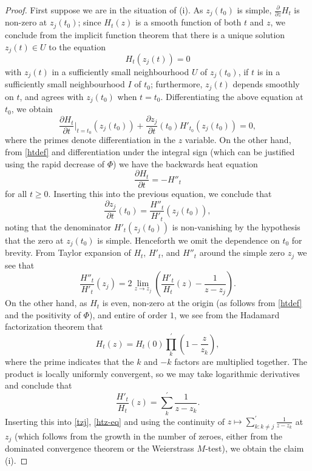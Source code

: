 \documentclass[a4paper,11pt,twoside]{amsart}
\begin{document}
\begin{proof}  First suppose we are in the situation of (i).  As $z_j(t_0)$ is simple, $\frac{\partial}{\partial z} H_t$ is non-zero at $z_j(t_0)$; since $H_t(z)$ is a smooth function of both $t$ and $z$, we conclude from the implicit function theorem that there is a unique solution $z_j(t) \in U$ to the equation
$$ H_t( z_j(t) ) = 0$$
with $z_j(t)$ in a sufficiently small neighbourhood $U$ of $z_j(t_0)$, if $t$ is in a sufficiently small neighbourhood $I$ of $t_0$; furthermore, $z_j(t)$ depends smoothly on $t$, and agrees with $z_j(t_0)$ when $t=t_0$.  Differentiating the above equation at $t_0$, we obtain
$$ \frac{\partial H_t}{\partial t}|_{t=t_0}( z_j(t_0) ) + \frac{\partial z_j}{\partial t}(t_0) H'_{t_0}(z_j(t_0)) = 0,$$
where the primes denote differentiation in the $z$ variable.
On the other hand, from \eqref{htdef} and differentiation under the integral sign (which can be justified using the rapid decrease of $\Phi$) we have the backwards heat equation
\begin{equation}\label{back}
\frac{\partial H_t}{\partial t} = -H''_t
\end{equation}
for all $t \geq 0$.  Inserting this into the previous equation, we conclude that
\begin{equation}\label{tzj}
\frac{\partial z_j}{\partial t}(t_0)  = \frac{H''_t}{H'_t}( z_j(t_0) ),
\end{equation}
noting that the denominator $H'_t(z_j(t_0))$ is non-vanishing by the hypothesis that the zero at $z_j(t_0)$ is simple.  Henceforth we omit the dependence on $t_0$ for brevity.  From Taylor expansion of $H_t$, $H'_t$, and $H''_t$ around the simple zero $z_j$ we see that
\begin{equation}\label{htz-eq}
 \frac{H''_t}{H'_t}( z_j) = 2 \lim_{z \to z_j}\left(  \frac{H'_t}{H_t}( z) - \frac{1}{z-z_j} \right).
\end{equation}
On the other hand, as $H_t$ is even, non-zero at the origin (as follows from \eqref{htdef} and the positivity of $\Phi$), and entire of order $1$, we see from the Hadamard factorization theorem that
$$ H_t(z) = H_t(0) \prod_k^{\prime} \left(1 - \frac{z}{z_k}\right),$$
where the prime indicates that the $k$ and $-k$ factors are multiplied together.  The product is locally uniformly convergent, so we may take logarithmic derivatives and conclude that
$$ \frac{H'_t}{H_t}(z) = \sum_k^{\prime} \frac{1}{z-z_k}.$$
Inserting this into \eqref{tzj}, \eqref{htz-eq} and using the continuity of $z \mapsto \sum_{k: k \neq j}^\prime \frac{1}{z-z_k}$ at $z_j$ (which follows from the growth in the number of zeroes, either from the dominated convergence theorem or the Weierstrass $M$-test), we obtain the claim (i).


\end{proof}
\end{document}
